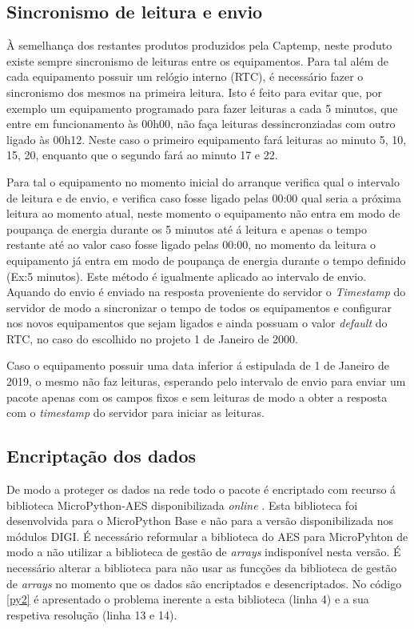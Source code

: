 \subsection {Sincronismo de leitura e envio} \label{sinc}

\par À semelhança dos restantes produtos produzidos pela Captemp, neste produto existe sempre sincronismo de leituras entre os equipamentos. Para tal além de cada equipamento possuir um relógio interno (RTC), é necessário fazer o sincronismo dos mesmos na primeira leitura. Isto é feito para evitar que, por exemplo um equipamento programado para fazer leituras a cada 5 minutos, que entre em funcionamento às 00h00, não faça leituras dessincronziadas com outro ligado às 00h12. Neste caso o primeiro equipamento fará leituras ao minuto 5, 10, 15, 20, enquanto que o segundo fará ao minuto 17 e 22.
\par Para tal o equipamento no momento inicial do arranque verifica qual o intervalo de leitura e de envio, e verifica caso fosse ligado pelas 00:00 qual seria a próxima leitura ao momento atual, neste momento o equipamento não entra em modo de poupança de energia durante os 5 minutos até á leitura e apenas o tempo restante até ao valor caso fosse ligado pelas 00:00, no momento da leitura o equipamento já entra em modo de poupança de energia durante o tempo definido (Ex:5 minutos). Este método é igualmente aplicado ao intervalo de envio. Aquando do envio é enviado na resposta proveniente do servidor o \textit{Timestamp} do servidor de modo a sincronizar o tempo de todos os equipamentos e configurar nos novos equipamentos que sejam ligados e ainda possuam o valor \textit{default} do RTC, no caso do escolhido no projeto 1 de Janeiro de 2000.
\par Caso o equipamento possuir uma data inferior á estipulada de 1 de Janeiro de 2019, o mesmo não faz leituras, esperando pelo intervalo de envio para enviar um pacote apenas com os campos fixos e sem leituras de modo a obter a resposta com o \textit{timestamp} do servidor para iniciar as leituras.


\subsection {Encriptação dos dados}

\par De modo a proteger os dados na rede todo o pacote é encriptado com recurso á biblioteca MicroPython-AES disponibilizada \textit{online} \cite{microaes}. Esta biblioteca foi desenvolvida para o MicroPython Base e não para a versão disponibilizada nos módulos DIGI. É necessário reformular a biblioteca do AES para MicroPyhton de modo a não utilizar a biblioteca de gestão de \textit{arrays} indisponível nesta versão. É necessário alterar a biblioteca para não usar as funcções da biblioteca de gestão de \textit{arrays} no momento que os dados são encriptados e desencriptados. No código \ref{py2} é apresentado o problema inerente a esta biblioteca (linha 4) e a sua respetiva resolução (linha 13 e 14).


